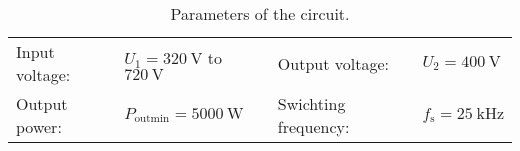 \begin{table}[ht]
    \centering  %
    \begin{tabular}{llll}
        \toprule
        
        Input voltage: &  $U_{\mathrm{1}} = \SI{320}{\volt}$ to $\SI{720}{\volt}$ & Output voltage: & $U_{\mathrm{2}} = \SI{400}{\volt}$ \\ 
        Output power: & $P_{\mathrm{outmin}} = \SI{5000}{\watt}$ & Swichting frequency: & $f_{\mathrm{s}} = \SI{25}{\kilo\hertz}$ \\ 
        \bottomrule
    \end{tabular}
    \caption{Parameters of the circuit.}  %
\end{table}